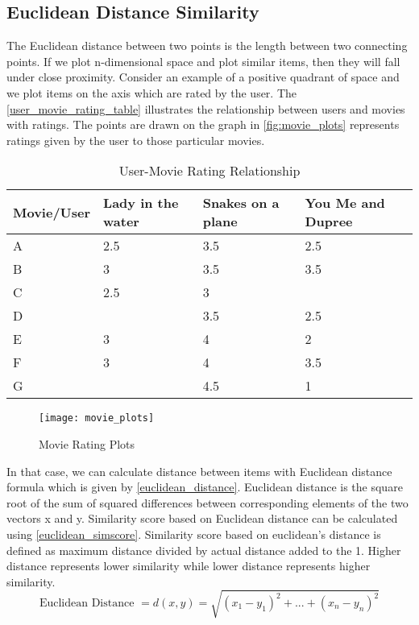 \subsection{Euclidean Distance Similarity}
\label{euclidean_distance}
The Euclidean distance between two points is the length between two connecting points. If we plot n-dimensional space and plot similar items, then they will fall under close proximity. Consider an example of a positive quadrant of space and we plot items on the axis which are rated by the user. The \autoref{user_movie_rating_table} illustrates the relationship between users and movies with ratings. The points are drawn on the graph in \autoref{fig:movie_plots} represents ratings given by the user to those particular movies.
\begin{table}[]
\centering
\begin{tabular}{|l|l|l|l|}
\hline
Movie/User & Lady in the water & Snakes on a plane & You Me and Dupree \\ \hline
A          & 2.5               & 3.5               & 2.5               \\ \hline
B          & 3                 & 3.5               & 3.5               \\ \hline
C          & 2.5               & 3                 &                   \\ \hline
D          &                   & 3.5               & 2.5               \\ \hline
E          & 3                 & 4                 & 2                 \\ \hline
F          & 3                 & 4                 & 3.5               \\ \hline
G          &                   & 4.5               & 1                 \\ \hline
\end{tabular}
\caption{User-Movie Rating Relationship \cite{11}}
\label{user_movie_rating_table}
\end{table}

\begin{singlespace}
\begin{figure}[H]
	\centering
	\texttt{[image: movie\_plots]}
	\caption{Movie Rating Plots \cite{11} } 
	\label{fig:movie_plots}
\end{figure}
\end{singlespace}

\noindent In that case, we can calculate distance between items with Euclidean distance formula which is given by \autoref{euclidean_distance}. Euclidean distance is the square root of the sum of squared differences between corresponding elements of the two vectors x and y. Similarity score based on Euclidean distance can be calculated using \autoref{euclidean_simscore}. Similarity score based on euclidean's distance is defined as maximum distance divided by actual distance added to the 1. Higher distance represents lower similarity while lower distance represents higher similarity.
\\
\begin{equation}
\textrm{Euclidean Distance } = d(x,y) = \sqrt{(x_1 - y_1)^2 + ... + (x_n - y_n)^2}
\label{euclidean_distance}
\end{equation}

